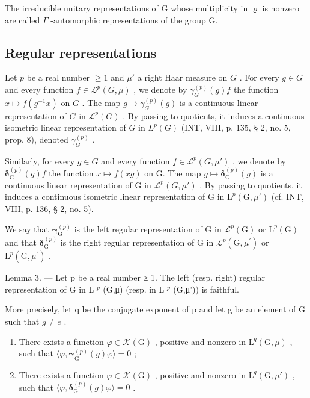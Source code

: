 The irreducible unitary representations of G whose multiplicity in \(\varrho\) is nonzero are called \(\Gamma\) -automorphic representations of the group G.

\subsection{Regular representations}

Let \(p\) be a real number \(\geqslant 1\) and \(\mu'\) a right Haar measure on \(G\) . For every \(g \in G\) and every function \(f \in \mathcal{L}^p(G, \mu)\) , we denote by \(\gamma_G^{(p)}(g)f\) the function \(x \mapsto f(g^{-1}x)\) on \(G\) . The map \(g \mapsto \gamma_G^{(p)}(g)\) is a continuous linear representation of \(G\) in \(\mathcal{L}^p(G)\) . By passing to quotients, it induces a continuous isometric linear representation of \(G\) in \(L^p(G)\) (INT, VIII, p. 135, § 2, no. 5, prop. 8), denoted \(\gamma_G^{(p)}\) .

Similarly, for every \(g \in G\) and every function \(f \in \mathcal{L}^{p}(G, \mu')\) , we denote by \(\boldsymbol{\delta}_{\mathrm{G}}^{(p)}(g)f\) the function \(x \mapsto f(xg)\) on G. The map \(g \mapsto \boldsymbol{\delta}_{\mathrm{G}}^{(p)}(g)\) is a continuous linear representation of G in \(\mathcal{L}^{p}(G, \mu')\) . By passing to quotients, it induces a continuous isometric linear representation of G in \(\mathrm{L}^{p}(\mathrm{G}, \mu')\) (cf. INT, VIII, p. 136, § 2, no. 5).

We say that \(\boldsymbol{\gamma}_{\mathrm{G}}^{(p)}\) is the left regular representation of G in \(\mathcal{L}^{p}(\mathrm{G})\) or \(\mathrm{L}^{p}(\mathrm{G})\) and that \(\boldsymbol{\delta}_{\mathrm{G}}^{(p)}\) is the right regular representation of G in \(\mathcal{L}^{p}(\mathrm{G},\mu^{\prime})\) or \(\mathrm{L}^{p}(\mathrm{G},\mu^{\prime})\) .

Lemma 3. — Let p be a real number ≥ 1. The left (resp. right) regular representation of G in L \(^{p}\) (G,μ) (resp. in L \(^{p}\) (G,μ')) is faithful.

More precisely, let q be the conjugate exponent of p and let g be an element of G such that \(g \neq e\) .

\begin{enumerate}
\def\labelenumi{\alph{enumi})}
\item
  There exists a function \(\varphi\in\mathcal{K}(\mathrm{G})\) , positive and nonzero in \(\mathrm{L}^{q}(\mathrm{G},\mu)\) , such that \(\langle\varphi,\boldsymbol{\gamma}_{\mathrm{G}}^{(p)}(g)\varphi\rangle=0\) ;
\item
  There exists a function \(\varphi\in\mathcal{K}(\mathrm{G})\) , positive and nonzero in \(\mathrm{L}^{q}(\mathrm{G},\mu')\) , such that \(\langle\varphi,\boldsymbol{\delta}_{\mathrm{G}}^{(p)}(g)\varphi\rangle=0\) .
\end{enumerate}

